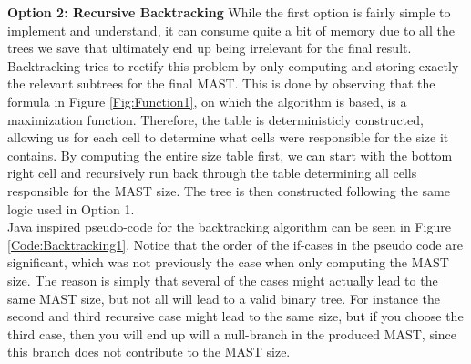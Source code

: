 \textbf{Option 2: Recursive Backtracking}
While the first option is fairly simple to implement and understand, it can consume quite a bit of memory due to all the trees we save that ultimately end up being irrelevant for the final result. Backtracking tries to rectify this problem by only computing and storing exactly the relevant subtrees for the final MAST. This is done by observing that the formula in Figure \ref{Fig:Function1}, on which the algorithm is based, is a maximization function. Therefore, the table is deterministicly constructed, allowing us for each cell to determine what cells were responsible for the size it contains. By computing the entire size table first, we can start with the bottom right cell and recursively run back through the table determining all cells responsible for the MAST size. The tree is then constructed following the same logic used in Option 1. 
\\
Java inspired pseudo-code for the backtracking algorithm can be seen in Figure \ref{Code:Backtracking1}. Notice that the order of the if-cases in the pseudo code are significant, which was not previously the case when only computing the MAST size. The reason is simply that several of the cases might actually lead to the same MAST size, but not all will lead to a valid binary tree. For instance the second and third recursive case might lead to the same size, but if you choose the third case, then you will end up will a null-branch in the produced MAST, since this branch does not contribute to the MAST size. 
    
